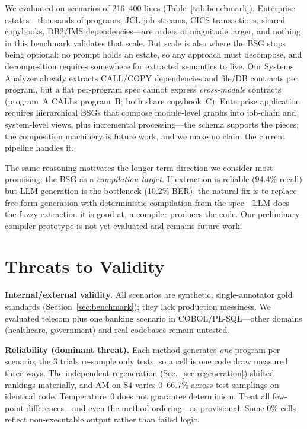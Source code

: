 \documentclass[conference]{IEEEtran}
\begin{document}
We evaluated on scenarios of 216--400 lines (Table~\ref{tab:benchmark}). Enterprise estates---thousands of programs, JCL job streams, CICS transactions, shared copybooks, DB2/IMS dependencies---are orders of magnitude larger, and nothing in this benchmark validates that scale. But scale is also where the BSG stops being optional: no prompt holds an estate, so any approach must decompose, and decomposition requires somewhere for extracted semantics to live. Our Systems Analyzer already extracts CALL/COPY dependencies and file/DB contracts per program, but a flat per-program spec cannot express \emph{cross-module} contracts (program~A CALLs program~B; both share copybook~C). Enterprise application requires hierarchical BSGs that compose module-level graphs into job-chain and system-level views, plus incremental processing---the schema supports the pieces; the composition machinery is future work, and we make no claim the current pipeline handles it.

The same reasoning motivates the longer-term direction we consider most promising: the BSG as a \emph{compilation target}. If extraction is reliable (94.4\% recall) but LLM generation is the bottleneck (10.2\% BER), the natural fix is to replace free-form generation with deterministic compilation from the spec---LLM does the fuzzy extraction it is good at, a compiler produces the code. Our preliminary compiler prototype is not yet evaluated and remains future work.

\section{Threats to Validity}
\label{sec:threats}

\textbf{Internal/external validity.} All scenarios are synthetic, single-annotator gold standards (Section~\ref{sec:benchmark}); they lack production messiness. We evaluated telecom plus one banking scenario in COBOL/PL-SQL---other domains (healthcare, government) and real codebases remain untested.

\textbf{Reliability (dominant threat).} Each method generates \emph{one} program per scenario; the 3 trials re-sample only tests, so a cell is one code draw measured three ways. The independent regeneration (Sec.~\ref{sec:regeneration}) shifted rankings materially, and AM-on-S4 varies 0--66.7\% across test samplings on identical code. Temperature~0 does not guarantee determinism. Treat all few-point differences---and even the method ordering---as provisional. Some 0\% cells reflect non-executable output rather than failed logic.
\end{document}
